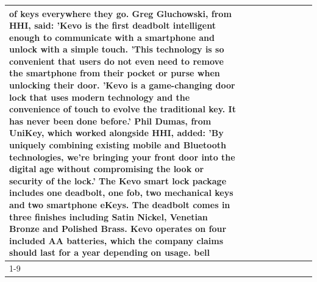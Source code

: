 \begin{table}[H]
\begin{tabular}{lllrlllll}
of keys everywhere they go. Greg Gluchowski, from HHI, said: 'Kevo is the first deadbolt intelligent enough to communicate with a smartphone and unlock with a simple touch. 'This technology is so convenient that users do not even need to remove the smartphone from their pocket or purse when unlocking their door. 'Kevo is a game-changing door lock that uses modern technology and the convenience of touch to evolve the traditional key. It has never been done before.' Phil Dumas, from UniKey, which worked alongside HHI, added: 'By uniquely combining existing mobile and Bluetooth technologies, we’re bringing your front door into the digital age without compromising the look or security of the lock.' The Kevo smart lock package includes one deadbolt, one fob, two mechanical keys and two smartphone eKeys. The deadbolt comes in three finishes including Satin Nickel, Venetian Bronze and Polished Brass. Kevo operates on four included AA batteries, which the company claims should last for a year depending on usage. bell \\
\cline{1-9}

\end{tabular}
\end{table}
